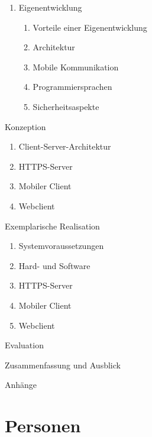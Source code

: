 \begin{enumerate}[
    labelindent=*,
    leftmargin=\widthof{\textbf{Kapitel~0:~}},
    label=\arabic*.
  ]
{\begin{enumerate}[label=\theenumi\arabic*.]
          \item Eigenentwicklung
            \begin{enumerate}[label=\theenumi\arabic*.]
                \item Vorteile einer Eigenentwicklung
                \item Architektur
                \item Mobile Kommunikation
                \item Programmiersprachen
                \item Sicherheitsaspekte
            \end{enumerate}
      \end{enumerate}
    \setcounter{enumi}{4}
    \item[\textbf{Kapitel~\arabic{enumi}:}]
      Konzeption
      \begin{enumerate}[label=\theenumi\arabic*.]
          \item Client-Server-Architektur
          \item HTTPS-Server
          \item Mobiler Client
          \item Webclient
      \end{enumerate}
    \setcounter{enumi}{5}
    \item[\textbf{Kapitel~\arabic{enumi}:}]
      Exemplarische Realisation
      \begin{enumerate}[label=\theenumi\arabic*.]
          \item Systemvoraussetzungen
          \item Hard- und Software
          \item HTTPS-Server
          \item Mobiler Client
          \item Webclient
      \end{enumerate}
      }
    \setcounter{enumi}{6}
    \item[\textbf{Kapitel~\arabic{enumi}:}]
      Evaluation
    \setcounter{enumi}{7}
    \item[\textbf{Kapitel~\arabic{enumi}:}]
      Zusammenfassung und Ausblick
    \item[]
      Anhänge

  \end{enumerate}


\section{Personen}
\label{sec:personen}

